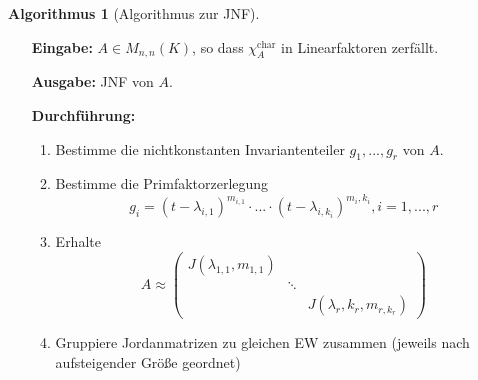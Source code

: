 \documentclass[a4paper, titlepage]{article}
\theoremstyle{definition}
\newtheorem{alg}[satz]{Algorithmus}
\begin{document}
    \begin{alg}[Algorithmus zur JNF]
        \begin{enumerate}[Eingabe:]
            \item [\textbf{Eingabe:}] $A\in M_{n,n}(K)$, so dass $\chi_{A}^{\text{char}}$ in Linearfaktoren zerfällt.
            \item [\textbf{Ausgabe:}] JNF von $A$.
            \item [\textbf{Durchführung:}] 
            \begin{enumerate}[1.]
                \item Bestimme die nichtkonstanten Invariantenteiler $g_1,...,g_r$ von $A$.
                \item Bestimme die Primfaktorzerlegung 
                $$ g_i=(t-\lambda_{i,1})^{m_{i,1}}\cdot ... \cdot (t-\lambda_{i,k_i})^{m_i,k_i}, i=1,...,r$$
                \item Erhalte 
                $$A\approx \begin{pmatrix}
                    J(\lambda_{1,1},m_{1,1})& & \\
                    & \ddots & \\
                    & & J(\lambda_r,k_r,m_{r,k_r})
                \end{pmatrix}$$
                \item Gruppiere Jordanmatrizen zu gleichen EW zusammen (jeweils nach aufsteigender Größe geordnet)
            \end{enumerate}
        \end{enumerate}
    \end{alg}
\end{document}
